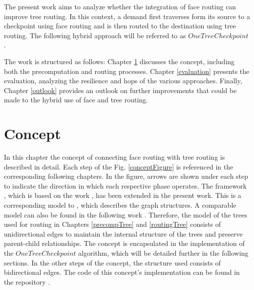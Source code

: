 \documentclass[a4paper,UKenglish,cleveref, autoref, thm-restate,dvipsnames]{lipics-v2021}
\begin{document}
The present work aims to analyze whether the integration of face routing can improve tree routing.
In this context, a demand first traverses form its source to a checkpoint using face routing and is then routed to the destination using tree routing. The following hybrid approach will be referred to as $One Tree Checkpoint$.

The work is structured as follows: Chapter \ref{Concept} discusses the concept, including both the precomputation and routing processes. Chapter \ref{evaluation} presents the evaluation, analyzing the resilience and hops of the various approaches. Finally, Chapter \ref{outlook} provides an outlook on further improvements that could be made to the hybrid use of face and tree routing.
 
\section{Concept}
\label{Concept}
In this chapter the concept of connecting face routing with tree routing is described in detail. Each step of the Fig. \ref{conceptFigure} is referenced in the corresponding following chapters. 
In the figure, arrows are shown under each step to indicate the direction in which each respective phase operates.
The framework \cite{fast-failover-og}, which is based on the work \cite{casa}, has been extended in the present work. This is a corresponding model to \cite{casa}, which describes the graph structures. A comparable model can also be found in the following work \cite{tree}.
Therefore, the model of the trees used for routing in Chapters \ref{precompTree} and \ref{routingTree} consists of unidirectional edges to maintain the internal structure of the trees and preserve parent-child relationships.
The concept is encapsulated in the implementation of the $OneTreeCheckpoint$ algorithm, which will be detailed further in the following sections.
In the other steps of the concept, the structure used consists of bidirectional edges.
The code of this concept's implementation can be found in the repository \cite{my-repo}.
\end{document}

